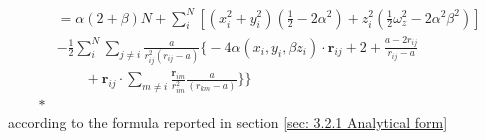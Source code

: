 \begin{align}
    &= \alpha (2 + \beta) N + \sum_i^N \left[ (x_i^2 + y_i^2)\left(\frac{1}{2}- 2\alpha^2 \right) +  z_i^2\left( \frac{1}{2} \omega_z^2 - 2\alpha^2\beta^2 \right) \right] \nonumber\\
    &-  \frac{1}{2} \sum_i^N \sum_{j\neq i} \frac{a}{r_{ij}^2 (r_{ij} - a)} \bigg\{ -4 \alpha \left( x_i, y_i, \beta z_i \right) \cdot \mathbf{r}_{ij} + 2 + \frac{a - 2r_{ij}}{r_{ij} - a } \nonumber\\
    &\quad \quad+ \mathbf{r}_{ij} \cdot \sum_{m \neq i}   \frac{\mathbf{r}_{im}}{r_{im}^2} \frac{a}{\left( r_{km} - a \right)} \bigg\} \bigg\}\nonumber\\*
\end{align}
according to the formula reported in section \ref{sec: 3.2.1 Analytical form}
